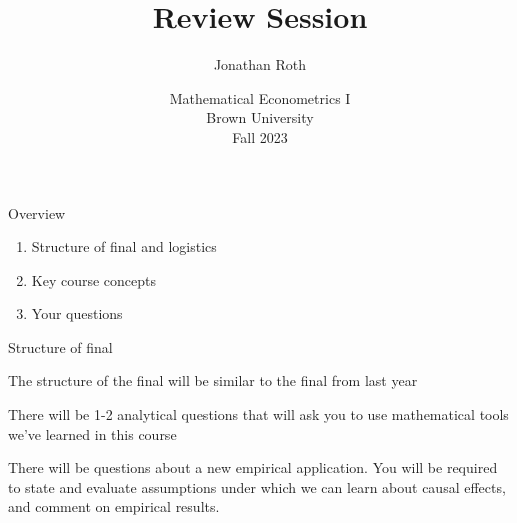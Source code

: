 \documentclass[11pt,english,handout]{beamer}
\newenvironment{wideitemize}{\itemize\addtolength{\itemsep}{10pt}}{\enditemize}
\begin{document}
	
	\begin{frame}[noframenumbering]{}
		\vspace{0.5cm}
		\title[]{Review Session}
		\author{Jonathan Roth}
		\date{Mathematical Econometrics I \\ Brown University\\Fall 2023} 
		\titlepage {\small{}\ }\thispagestyle{empty} \vspace{-30pt}
		
	\end{frame}


\begin{frame}{Overview}
	\begin{enumerate}
		\item 
		Structure of final and logistics
		
		\item
		Key course concepts
		
		\item
		Your questions
	\end{enumerate}
\end{frame}
	
	
\begin{frame}{Structure of final}
	\begin{wideitemize}
		\item
		The structure of the final will be similar to the final from last year
		
		\item
		There will be 1-2 analytical questions that will ask you to use mathematical tools we've learned in this course
		
		\item
		There will be questions about a new empirical application. You will be required to state and evaluate assumptions under which we can learn about causal effects, and comment on empirical results.
		
	\end{wideitemize}
\end{frame}	
\end{document}
